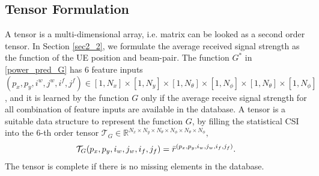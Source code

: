 \documentclass[12pt, draftcls, onecolumn]{IEEEtran}
\theoremstyle{plain}
\theoremstyle{definition}
\theoremstyle{remark}
\begin{document}
\subsection{Tensor Formulation}
A tensor is a multi-dimensional array, i.e. matrix can be looked as a second order tensor.
In Section \ref{sec2_2}, we formulate the average received signal strength as the function of the UE position and beam-pair.
The function $G^*$ in \eqref{power_pred_G}  has $6$ feature inputs $(p_x,p_y,i^w,j^w,i^f,j^f)\in[1,N_x]\times[1,N_y]\times[1,N_{\theta}]\times[1,N_\phi]\times[1,N_\theta]\times[1,N_\phi]$,
and it is learned by the function $G$ only if the average receive signal strength for all combination of feature inputs are available in the database.
A tensor is a suitable data structure to represent the function $G$, by filling the statistical CSI into the $6$-th order tensor $\mathcal{T}_G\in\mathbb{R}^{N_x\times N_y \times N_\theta \times N_\phi \times N_\theta \times N_\phi},$
\begin{equation}
\label{database_tensor_form}
\begin{aligned}
\mathcal{T}_G(p_x,p_y,i_w,j_w,i_f,j_f)=\Bar{r}^{(p_x,p_y,i_w,j_w,i_f,j_f)}.
\end{aligned}  
\end{equation}
The tensor is complete if there is no missing elements in the database.
\end{document}
